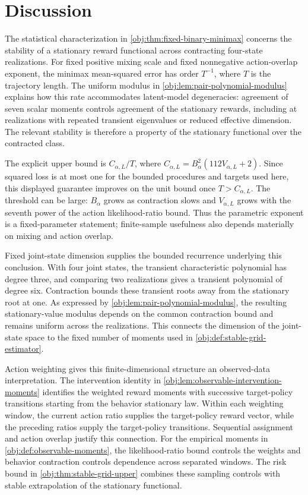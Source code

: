 \section{Discussion}

The statistical characterization in \cref{obj:thm:fixed-binary-minimax} concerns the stability of a stationary reward functional across contracting four-state realizations. For fixed positive mixing scale and fixed nonnegative action-overlap exponent, the minimax mean-squared error has order \(T^{-1}\), where \(T\) is the trajectory length. The uniform modulus in \cref{obj:lem:pair-polynomial-modulus} explains how this rate accommodates latent-model degeneracies: agreement of seven scalar moments controls agreement of the stationary rewards, including at realizations with repeated transient eigenvalues or reduced effective dimension. The relevant stability is therefore a property of the stationary functional over the contracted class.

The explicit upper bound is \(C_{\alpha,L}/T\), where \(C_{\alpha,L}=B_\alpha^2(112V_{\alpha,L}+2)\). Since squared loss is at most one for the bounded procedures and targets used here, this displayed guarantee improves on the unit bound once \(T>C_{\alpha,L}\). The threshold can be large: \(B_\alpha\) grows as contraction slows and \(V_{\alpha,L}\) grows with the seventh power of the action likelihood-ratio bound. Thus the parametric exponent is a fixed-parameter statement; finite-sample usefulness also depends materially on mixing and action overlap.

Fixed joint-state dimension supplies the bounded recurrence underlying this conclusion. With four joint states, the transient characteristic polynomial has degree three, and comparing two realizations gives a transient polynomial of degree six. Contraction bounds these transient roots away from the stationary root at one. As expressed by \cref{obj:lem:pair-polynomial-modulus}, the resulting stationary-value modulus depends on the common contraction bound and remains uniform across the realizations. This connects the dimension of the joint-state space to the fixed number of moments used in \cref{obj:def:stable-grid-estimator}.

Action weighting gives this finite-dimensional structure an observed-data interpretation. The intervention identity in \cref{obj:lem:observable-intervention-moments} identifies the weighted reward moments with successive target-policy transitions starting from the behavior stationary law. Within each weighting window, the current action ratio supplies the target-policy reward vector, while the preceding ratios supply the target-policy transitions. Sequential assignment and action overlap justify this connection. For the empirical moments in \cref{obj:def:observable-moments}, the likelihood-ratio bound controls the weights and behavior contraction controls dependence across separated windows. The risk bound in \cref{obj:thm:stable-grid-upper} combines these sampling controls with stable extrapolation of the stationary functional.


